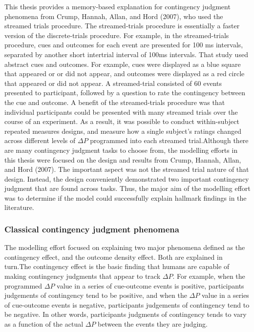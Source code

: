 \documentclass[
  english,
  man,floatsintext]{apa6}
\begin{document}
This thesis provides a memory-based explanation for contingency judgment phenomena from Crump, Hannah, Allan, and Hord (2007), who used the streamed trials procedure. The streamed-trials procedure is essentially a faster version of the discrete-trials procedure. For example, in the streamed-trials procedure, cues and outcomes for each event are presented for 100 ms intervals, separated by another short intertrial interval of 100ms intervals. That study used abstract cues and outcomes. For example, cues were displayed as a blue square that appeared or or did not appear, and outcomes were displayed as a red circle that appeared or did not appear. A streamed-trial consisted of 60 events presented to participant, followed by a question to rate the contingency between the cue and outcome. A benefit of the streamed-trials procedure was that individual participants could be presented with many streamed trials over the course of an experiment. As a result, it was possible to conduct within-subject repeated measures designs, and measure how a single subject's ratings changed across different levels of \(\Delta P\) programmed into each streamed trial.Although there are many contingency judgment tasks to choose from, the modelling efforts in this thesis were focused on the design and results from Crump, Hannah, Allan, and Hord (2007). The important aspect was not the streamed trial nature of that design. Instead, the design conveniently demonstrated two important contingency judgment that are found across tasks. Thus, the major aim of the modelling effort was to determine if the model could successfully explain hallmark findings in the literature.

\hypertarget{classical-contingency-judgment-phenomena}{%
\subsubsection{Classical contingency judgment phenomena}\label{classical-contingency-judgment-phenomena}}

The modelling effort focused on explaining two major phenomena defined as the contingency effect, and the outcome density effect. Both are explained in turn.The contingency effect is the basic finding that humans are capable of making contingency judgments that appear to track \(\Delta P\). For example, when the programmed \(\Delta P\) value in a series of cue-outcome events is positive, participants judgements of contingency tend to be positive, and when the \(\Delta P\) value in a series of cue-outcome events is negative, participants judgements of contingency tend to be negative. In other words, participants judgments of contingency tends to vary as a function of the actual \(\Delta P\) between the events they are judging.
\end{document}
